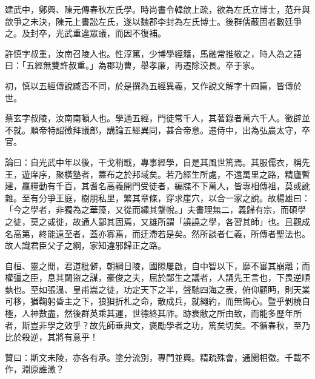 \begin{pinyinscope}
建武中，鄭興、陳元傳春秋左氏學。時尚書令韓歆上疏，欲為左氏立博士，范升與歆爭之未決，陳元上書訟左氏，遂以魏郡李封為左氏博士。後群儒蔽固者數廷爭之。及封卒，光武重違眾議，而因不復補。

許慎字叔重，汝南召陵人也。性淳篤，少博學經籍，馬融常推敬之，時人為之語曰：「五經無雙許叔重。」為郡功曹，舉孝廉，再遷除洨長。卒于家。

初，慎以五經傳說臧否不同，於是撰為五經異義，又作說文解字十四篇，皆傳於世。

蔡玄字叔陵，汝南南頓人也。學通五經，門徒常千人，其著錄者萬六千人。徵辟並不就。順帝特詔徵拜議郎，講論五經異同，甚合帝意。遷侍中，出為弘農太守，卒官。

論曰：自光武中年以後，干戈稍戢，專事經學，自是其風世篤焉。其服儒衣，稱先王，遊庠序，聚橫塾者，蓋布之於邦域矣。若乃經生所處，不遠萬里之路，精廬暫建，贏糧動有千百，其耆名高義開門受徒者，編牒不下萬人，皆專相傳祖，莫或訛雜。至有分爭王庭，樹朋私里，繁其章條，穿求崖穴，以合一家之說。故楊雄曰：「今之學者，非獨為之華藻，又從而繡其鞶帨。」夫書理無二，義歸有宗，而碩學之徒，莫之或徙，故通人鄙其固焉，又雄所謂「譊譊之學，各習其師」也。且觀成名高第，終能遠至者，蓋亦寡焉，而迂滯若是矣。然所談者仁義，所傳者聖法也。故人識君臣父子之綱，家知違邪歸正之路。

自桓、靈之閒，君道秕僻，朝綱日陵，國隙屢啟，自中智以下，靡不審其崩離；而權彊之臣，息其闚盜之謀，豪俊之夫，屈於鄙生之議者，人誦先王言也，下畏逆順埶也。至如張溫、皇甫嵩之徒，功定天下之半，聲馳四海之表，俯仰顧眄，則天業可移，猶鞠躬昏主之下，狼狽折札之命，散成兵，就繩約，而無悔心。暨乎剝橈自極，人神數盡，然後群英乘其運，世德終其祚。跡衰敝之所由致，而能多歷年所者，斯豈非學之效乎？故先師垂典文，褒勵學者之功，篤矣切矣。不循春秋，至乃比於殺逆，其將有意乎！

贊曰：斯文未陵，亦各有承。塗分流別，專門並興。精疏殊會，通閡相徵。千載不作，淵原誰澂？


\end{pinyinscope}